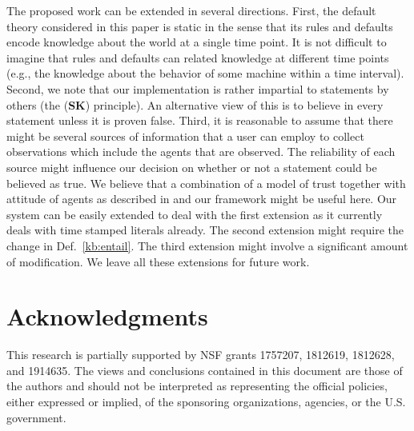 \documentclass{article}
\begin{document}
The proposed work can be extended in several directions. First, the default theory considered in this paper is static in the sense that its rules and defaults encode knowledge about the world at a single time point. It is not difficult to imagine that rules and defaults can related knowledge at different time points (e.g., the knowledge about the behavior of some machine within a time interval). 
Second, we note that our implementation is rather impartial to statements by others (the ({\bf SK}) principle). An alternative view of this is to believe in every statement unless it is proven false. Third, it is reasonable to assume that there might be several sources of information that a user can employ to collect observations which include the agents that are observed. The reliability of each source might influence our decision on whether or not a statement could be believed as true. We believe that a combination of a model of trust together with attitude of agents as described in \cite{SabaterS05,ArtzG07} and our framework might be useful here. 
Our  system can be easily extended to deal with the first extension 
as it currently deals with time stamped literals already. The second extension might require the change in Def.~\ref{kb:entail}. The third extension might involve a significant amount of modification. We leave all these extensions for future work.  


\section*{Acknowledgments}

This research is partially supported by NSF grants 1757207, 1812619, 1812628, and 1914635. The views and conclusions contained in this document are those of the authors and should not be interpreted as representing the official policies, either expressed or implied, of the sponsoring organizations, agencies, or the U.S. government.


 
 

%


\end{document}
